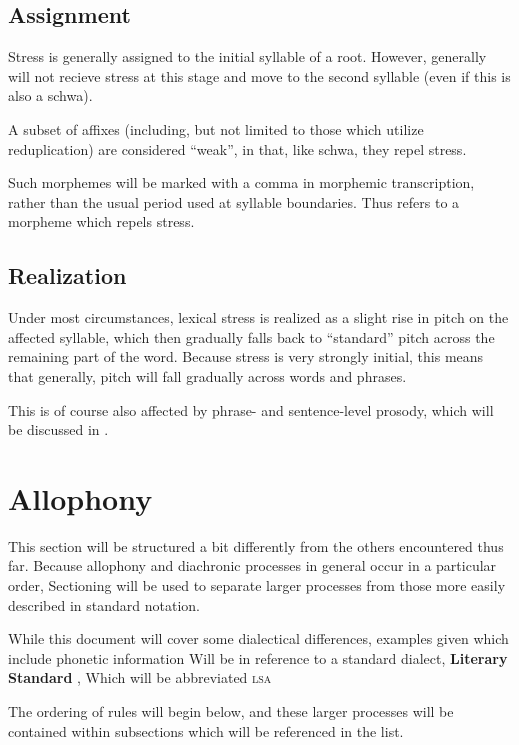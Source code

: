 \subsection{Assignment}
Stress is generally assigned to the initial syllable of a root. However,  generally will not recieve stress at this stage and move to the second syllable (even if this is also a schwa).

A subset of affixes (including, but not limited to those which utilize reduplication) are considered ``weak'', in that, like schwa, they repel stress.

Such morphemes will be marked with a comma in morphemic transcription, rather than the usual period used at syllable boundaries. Thus  refers to a morpheme  which repels stress.

\subsection{Realization}
Under most circumstances, lexical stress is realized as a slight rise in pitch on the affected syllable, which then gradually falls back to ``standard'' pitch across the remaining part of the word. Because stress is very strongly initial, this means that generally, pitch will fall gradually across words and phrases.

This is of course also affected by phrase- and sentence-level prosody, which will be discussed in .

\section{Allophony}
This section will be structured a bit differently from the others encountered thus far. Because allophony and diachronic processes in general occur in a particular order, Sectioning will be used to separate larger processes from those more easily described in standard notation.

While this document will cover some dialectical differences, examples given which include phonetic information Will be in reference to a standard dialect, \textbf{Literary Standard \langname}, Which will be abbreviated \textsc{lsa}

The ordering of rules will begin below, and these larger processes will be contained within subsections which will be referenced in the list.


